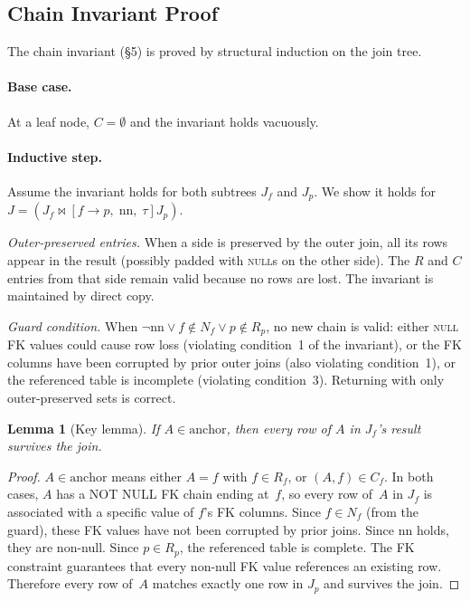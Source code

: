 \documentclass[11pt]{article}
\newtheorem{lemma}[theorem]{Lemma}
\theoremstyle{definition}
\newcommand{\joins}{\bowtie}
\newcommand{\fkjoin}[1]{\joins\![#1]}
\newcommand{\Rf}{R_f}
\newcommand{\Rp}{R_p}
\newcommand{\Nf}{N_f}
\newcommand{\Cf}{C_f}
\newcommand{\Jf}{J_f}
\newcommand{\Jp}{J_p}
\newcommand{\nn}{\mathrm{nn}}
\newcommand{\anchor}{\mathrm{anchor}}
\begin{document}
\subsection{Chain Invariant Proof}

The chain invariant (\S5) is proved by structural induction on the
join tree.

\paragraph{Base case.}
At a leaf node, $C = \emptyset$ and the invariant holds vacuously.

\paragraph{Inductive step.}
Assume the invariant holds for both subtrees $\Jf$ and $\Jp$.  We
show it holds for $J = (\Jf \fkjoin{f \to p,\;\nn,\;\tau} \Jp)$.

\medskip\noindent
\emph{Outer-preserved entries.}\;
When a side is preserved by the outer join, all its rows appear in the
result (possibly padded with \textsc{null}s on the other side).  The
$R$ and $C$ entries from that side remain valid because no rows are
lost.  The invariant is maintained by direct copy.

\medskip\noindent
\emph{Guard condition.}\;
When $\lnot\nn \lor f \notin \Nf \lor p \notin \Rp$, no new chain is
valid: either \textsc{null} FK values could cause row loss (violating
condition~1 of the invariant), or the FK columns have been corrupted
by prior outer joins (also violating condition~1), or the referenced
table is incomplete (violating condition~3).  Returning with only
outer-preserved sets is correct.

\begin{lemma}[Key lemma]
If $A \in \anchor$, then every row of $A$ in $\Jf$'s result survives
the join.
\end{lemma}

\begin{proof}
$A \in \anchor$ means either $A = f$ with $f \in \Rf$, or
$(A, f) \in \Cf$.  In both cases, $A$ has a NOT NULL FK chain ending
at~$f$, so every row of~$A$ in $\Jf$ is associated with a specific
value of $f$'s FK columns.  Since $f \in \Nf$ (from the guard), these
FK values have not been corrupted by prior joins.  Since $\nn$ holds,
they are non-null.  Since $p \in \Rp$, the referenced table is
complete.  The FK constraint guarantees that every non-null FK value
references an existing row.  Therefore every row of~$A$ matches
exactly one row in $\Jp$ and survives the join.
\end{proof}
\end{document}
